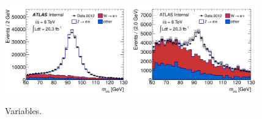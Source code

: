 \begin{figure}[tp]
  \centering
  \includegraphics[width=0.48\textwidth]{figures/PERF-2013-06_tmp/eveto_mvis_mediumID_loosePPOLR_noeveto}
  \includegraphics[width=0.48\textwidth]{figures/PERF-2013-06_tmp/eveto_mvis_mediumID_loosePPOLR_looseeveto}
  \caption{Variables.}
  \label{fig:taus-electronfakes2}
\end{figure}


